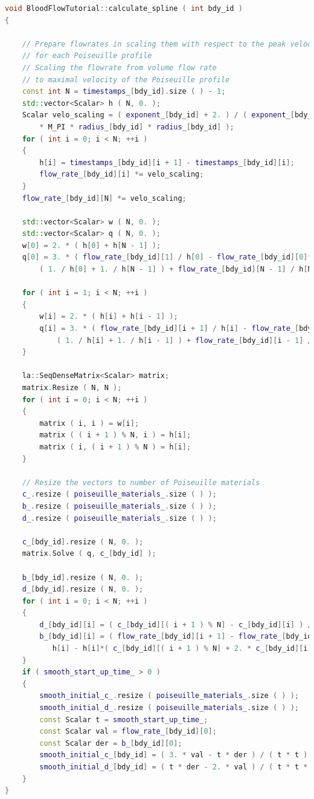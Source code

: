 \documentclass[a4paper, 11pt, twoside]{article}
\begin{document}
\begin{lstlisting}[language=C++, basicstyle={\footnotesize, \ttfamily}, keywordstyle=\color{blue},  numbers=none, tabsize=4]
void BloodFlowTutorial::calculate_spline ( int bdy_id )
{

    // Prepare flowrates in scaling them with respect to the peak velocity 
    // for each Poiseuille profile
    // Scaling the flowrate from volume flow rate 
    // to maximal velocity of the Poiseuille profile
    const int N = timestamps_[bdy_id].size ( ) - 1;
    std::vector<Scalar> h ( N, 0. );
    Scalar velo_scaling = ( exponent_[bdy_id] + 2. ) / ( exponent_[bdy_id] 
        * M_PI * radius_[bdy_id] * radius_[bdy_id] );
    for ( int i = 0; i < N; ++i )
    {
        h[i] = timestamps_[bdy_id][i + 1] - timestamps_[bdy_id][i];
        flow_rate_[bdy_id][i] *= velo_scaling;
    }
    flow_rate_[bdy_id][N] *= velo_scaling;

    std::vector<Scalar> w ( N, 0. );
    std::vector<Scalar> q ( N, 0. );
    w[0] = 2. * ( h[0] + h[N - 1] );
    q[0] = 3. * ( flow_rate_[bdy_id][1] / h[0] - flow_rate_[bdy_id][0]*
        ( 1. / h[0] + 1. / h[N - 1] ) + flow_rate_[bdy_id][N - 1] / h[N - 1] );

    for ( int i = 1; i < N; ++i )
    {
        w[i] = 2. * ( h[i] + h[i - 1] );
        q[i] = 3. * ( flow_rate_[bdy_id][i + 1] / h[i] - flow_rate_[bdy_id][i]*
            ( 1. / h[i] + 1. / h[i - 1] ) + flow_rate_[bdy_id][i - 1] / h[i - 1] );
    }

    la::SeqDenseMatrix<Scalar> matrix;
    matrix.Resize ( N, N );
    for ( int i = 0; i < N; ++i )
    {
        matrix ( i, i ) = w[i];
        matrix ( ( i + 1 ) % N, i ) = h[i];
        matrix ( i, ( i + 1 ) % N ) = h[i];
    }

    // Resize the vectors to number of Poiseuille materials
    c_.resize ( poiseuille_materials_.size ( ) );
    b_.resize ( poiseuille_materials_.size ( ) );
    d_.resize ( poiseuille_materials_.size ( ) );

    c_[bdy_id].resize ( N, 0. );
    matrix.Solve ( q, c_[bdy_id] );

    b_[bdy_id].resize ( N, 0. );
    d_[bdy_id].resize ( N, 0. );
    for ( int i = 0; i < N; ++i )
    {
        d_[bdy_id][i] = ( c_[bdy_id][( i + 1 ) % N] - c_[bdy_id][i] ) / ( 3. * h[i] );
        b_[bdy_id][i] = ( flow_rate_[bdy_id][i + 1] - flow_rate_[bdy_id][i] ) / 
           h[i] - h[i]*( c_[bdy_id][( i + 1 ) % N] + 2. * c_[bdy_id][i] ) / 3.;
    }
    if ( smooth_start_up_time_ > 0 )
    {
        smooth_initial_c_.resize ( poiseuille_materials_.size ( ) );
        smooth_initial_d_.resize ( poiseuille_materials_.size ( ) );
        const Scalar t = smooth_start_up_time_;
        const Scalar val = flow_rate_[bdy_id][0];
        const Scalar der = b_[bdy_id][0];
        smooth_initial_c_[bdy_id] = ( 3. * val - t * der ) / ( t * t );
        smooth_initial_d_[bdy_id] = ( t * der - 2. * val ) / ( t * t * t );
    }
}

\end{lstlisting}
\end{document}
